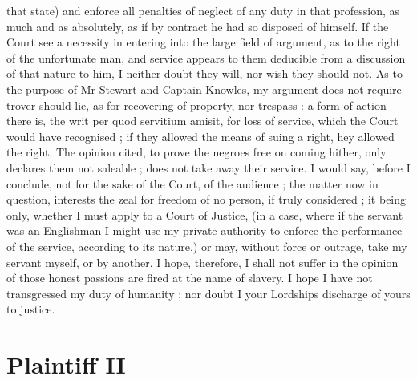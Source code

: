 \documentclass[a4paper]{article}
\begin{document}
that state) and enforce all penalties of neglect of any duty in that profession, as much and as absolutely, as if by contract he had so disposed of himself. If the Court see a necessity in entering into the large field of argument, as to the right of the unfortunate man, and service appears to them deducible from a discussion of that nature to him, I neither doubt they will, nor wish they should not. As to the purpose of Mr Stewart and Captain Knowles, my argument does not require trover should lie, as for recovering of property, nor trespass : a form of action there is, the writ per quod servitium amisit, for loss of service, which the Court would have recognised ; if they allowed the means of suing a right, hey allowed the right. The opinion cited, to prove the negroes free on coming hither, only declares them not saleable ; does not take away their service. I would say, before I conclude, not for the sake of the Court, of the audience ; the matter now in question, interests the zeal for freedom of no person, if truly considered ; it being only, whether I must apply to a Court of Justice, (in a case, where if the servant was an Englishman I might use my private authority to enforce the performance of the service, according to its nature,) or may, without force or outrage, take my servant myself, or by another. I hope, therefore, I shall not suffer in the opinion of those honest passions are fired at the name of slavery. I hope I have not transgressed my duty of humanity ; nor doubt I your Lordships discharge of yours to justice.

\section{Plaintiff II}
\end{document}
